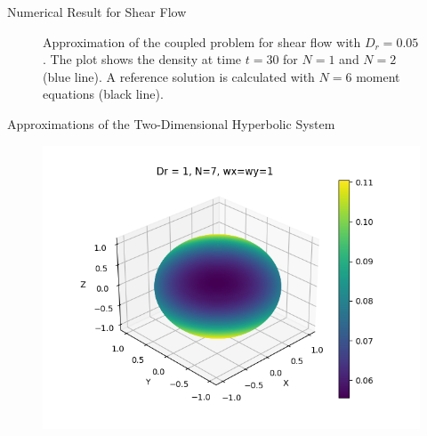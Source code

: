 \begin{frame}{Numerical Result for Shear Flow}
\begin{figure}
\begin{minipage}{0.46\textwidth}
			\end{minipage}
			\caption{Approximation of the coupled problem for shear flow with $D_r =0.05$. The plot shows the density at time $t=30$ for $N = 1$ and $N = 2$ (blue line). A reference solution is calculated with $N = 6$ moment equations (black line).}
			\label{ClusterFormation}
		\end{figure}
\end{frame}




\begin{frame}{Approximations of the Two-Dimensional Hyperbolic System}
		\scriptsize
		\begin{figure}[H]
			\centering
			\begin{minipage}{0.4\textwidth}
				\includegraphics[scale=0.23]{Bilder_wxwy/Sol_onSphere_wx=1=wy_Dr=1_N=7}
			\end{minipage}
			\hfill 
			\begin{minipage}{0.4\textwidth}

\end{minipage}
\end{figure}
\end{frame}
